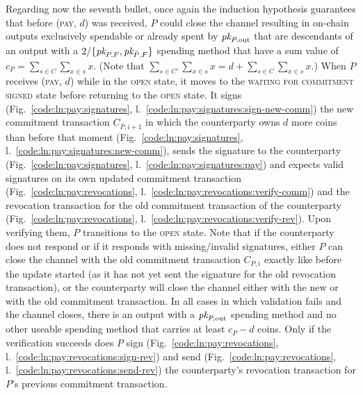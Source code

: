   Regarding now the seventh bullet, once again the induction hypothesis guarantees
  that before (\textsc{pay}, $d$) was received, $P$ could close the channel
  resulting in on-chain outputs exclusively spendable or already spent by
  $\textit{pk}_{P, \mathrm{out}}$ that are descendants of an output with a $2/\{\textit{pk}_{P,
  F}, \textit{pk}_{\bar{P}, F}\}$ spending method that have a sum value of $c_P =
  \sum\limits_{s \in C} \sum\limits_{x \in s} x$. (Note that $\sum\limits_{s \in
  C'} \sum\limits_{x \in s} x = d + \sum\limits_{s \in C} \sum\limits_{x \in s}
  x$.) When $P$ receives (\textsc{pay}, $d$) while in the \textsc{open} state,
  it moves to the \textsc{waiting for commitment signed} state before returning
  to the \textsc{open} state. It signs (Fig.~\ref{code:ln:pay:signatures},
  l.~\ref{code:ln:pay:signatures:sign-new-comm}) the new commitment transaction
  $C_{\bar{P}, i+1}$ in which the counterparty owns $d$ more coins than before
  that moment (Fig.~\ref{code:ln:pay:signatures},
  l.~\ref{code:ln:pay:signatures:new-comm}), sends the signature to the
  counterparty (Fig.~\ref{code:ln:pay:signatures},
  l.~\ref{code:ln:pay:signatures:pay}) and expects valid signatures on its own
  updated commitment transaction (Fig.~\ref{code:ln:pay:revocations},
  l.~\ref{code:ln:pay:revocations:verify-comm}) and the revocation transaction
  for the old commitment transaction of the counterparty
  (Fig.~\ref{code:ln:pay:revocations},
  l.~\ref{code:ln:pay:revocations:verify-rev}). Upon verifying them, $P$
  transitions to the \textsc{open} state. Note that if the counterparty
  does not respond or if it responds with missing/invalid signatures, either $P$
  can close the channel with the old commitment transaction $C_{P, i}$ exactly
  like before the update started (as it has not yet sent the signature for the
  old revocation transaction), or the counterparty will close the channel either
  with the new or with the old commitment transaction. In all cases in which
  validation fails and the channel closes, there is an output with a $\textit{pk}_{P,
  \mathrm{out}}$ spending method and no other useable spending method that
  carries at least $c_P - d$ coins. Only if the verification succeeds does $P$
  sign (Fig.~\ref{code:ln:pay:revocations},
  l.~\ref{code:ln:pay:revocations:sign-rev}) and send
  (Fig.~\ref{code:ln:pay:revocations},
  l.~\ref{code:ln:pay:revocations:send-rev}) the counterparty's revocation
  transaction for $P$'s previous commitment transaction.

